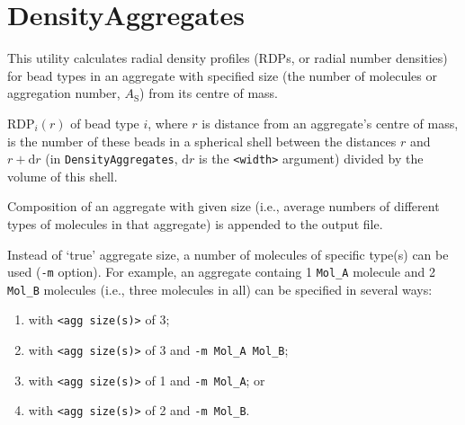 \section{DensityAggregates} \label{sec:DensityAggregates}

This utility calculates radial density profiles (RDPs, or radial number
densities) for bead types in an aggregate with specified size (the number
of molecules or aggregation number, $A_{\mathrm{S}}$) from its centre of
mass.

RDP$_i(r)$ of bead type $i$, where $r$ is distance from an aggregate's
centre of mass, is the number of these beads in a spherical shell between
the distances $r$ and $r+\mathrm{d}r$ (in \texttt{DensityAggregates},
$\mathrm{d}r$ is the \texttt{<width>} argument) divided by the
volume of this shell.

Composition of an aggregate with given size (i.e., average numbers of
different types of molecules in that aggregate) is appended to the output
file.

Instead of `true' aggregate size, a number of molecules of specific type(s)
can be used (\texttt{-m} option). For example, an aggregate containg 1
\texttt{Mol\_A} molecule and 2 \texttt{Mol\_B} molecules (i.e., three
molecules in all) can be specified in several ways:
\begin{enumerate}[nosep]
  \item  with \texttt{<agg size(s)>} of 3;
  \item  with \texttt{<agg size(s)>} of 3 and \texttt{-m Mol\_A Mol\_B};
  \item  with \texttt{<agg size(s)>} of 1 and \texttt{-m Mol\_A}; or
  \item  with \texttt{<agg size(s)>} of 2 and \texttt{-m Mol\_B}.
\end{enumerate}

